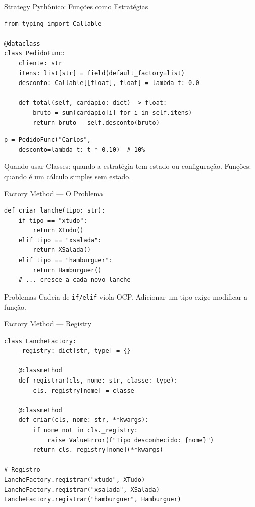 \documentclass[aspectratio=169]{beamer}
\begin{document}
\begin{frame}{Strategy Pythônico: Funções como Estratégias}
\begin{lstlisting}
from typing import Callable

@dataclass
class PedidoFunc:
    cliente: str
    itens: list[str] = field(default_factory=list)
    desconto: Callable[[float], float] = lambda t: 0.0

    def total(self, cardapio: dict) -> float:
        bruto = sum(cardapio[i] for i in self.itens)
        return bruto - self.desconto(bruto)
\end{lstlisting}

\begin{lstlisting}
p = PedidoFunc("Carlos",
    desconto=lambda t: t * 0.10)  # 10%
\end{lstlisting}

\begin{exampleblock}{Quando usar}
Classes: quando a estratégia tem estado ou configuração.
Funções: quando é um cálculo simples sem estado.
\end{exampleblock}
\end{frame}

\begin{frame}[fragile]{Factory Method --- O Problema}
\begin{lstlisting}
def criar_lanche(tipo: str):
    if tipo == "xtudo":
        return XTudo()
    elif tipo == "xsalada":
        return XSalada()
    elif tipo == "hamburguer":
        return Hamburguer()
    # ... cresce a cada novo lanche
\end{lstlisting}

\begin{alertblock}{Problemas}
Cadeia de \texttt{if/elif} viola OCP. Adicionar um tipo exige modificar a função.
\end{alertblock}
\end{frame}

\begin{frame}[fragile]{Factory Method --- Registry}
\begin{lstlisting}
class LancheFactory:
    _registry: dict[str, type] = {}

    @classmethod
    def registrar(cls, nome: str, classe: type):
        cls._registry[nome] = classe

    @classmethod
    def criar(cls, nome: str, **kwargs):
        if nome not in cls._registry:
            raise ValueError(f"Tipo desconhecido: {nome}")
        return cls._registry[nome](**kwargs)

# Registro
LancheFactory.registrar("xtudo", XTudo)
LancheFactory.registrar("xsalada", XSalada)
LancheFactory.registrar("hamburguer", Hamburguer)
\end{lstlisting}
\end{frame}
\end{document}
